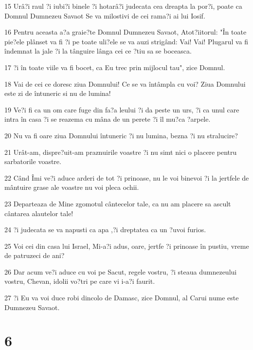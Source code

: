 \par 15 Urâ?i raul ?i iubi?i binele ?i hotarâ?i judecata cea dreapta la por?i, poate ca Domnul Dumnezeu Savaot Se va milostivi de cei rama?i ai lui Iosif.
\par 16 Pentru aceasta a?a graie?te Domnul Dumnezeu Savaot, Atot?iitorul: "În toate pie?ele plânset va fi ?i pe toate uli?ele se va auzi strigând: Vai! Vai! Plugarul va fi îndemnat la jale ?i la tânguire lânga cei ce ?tiu sa se boceasca.
\par 17 ?i în toate viile va fi bocet, ca Eu trec prin mijlocul tau", zice Domnul.
\par 18 Vai de cei ce doresc ziua Domnului! Ce se va întâmpla cu voi? Ziua Domnului este zi de întuneric si nu de lumina!
\par 19 Ve?i fi ca un om care fuge din fa?a leului ?i da peste un urs, ?i ca unul care intra în casa ?i se reazema cu mâna de un perete ?i îl mu?ca ?arpele.
\par 20 Nu va fi oare ziua Domnului întuneric ?i nu lumina, bezna ?i nu stralucire?
\par 21 Urât-am, dispre?uit-am praznuirile voastre ?i nu simt nici o placere pentru sarbatorile voastre.
\par 22 Când Îmi ve?i aduce arderi de tot ?i prinoase, nu le voi binevoi ?i la jertfele de mântuire grase ale voastre nu voi pleca ochii.
\par 23 Departeaza de Mine zgomotul cântecelor tale, ca nu am placere sa ascult cântarea alautelor tale!
\par 24 ?i judecata se va napusti ca apa ,?i dreptatea ca un ?uvoi furios.
\par 25 Voi cei din casa lui Israel, Mi-a?i adus, oare, jertfe ?i prinoase în pustiu, vreme de patruzeci de ani?
\par 26 Dar acum ve?i aduce cu voi pe Sacut, regele vostru, ?i steaua dumnezeului vostru, Chevan, idolii vo?tri pe care vi i-a?i faurit.
\par 27 ?i Eu va voi duce robi dincolo de Damasc, zice Domnul, al Carui nume este Dumnezeu Savaot.

\chapter{6}

